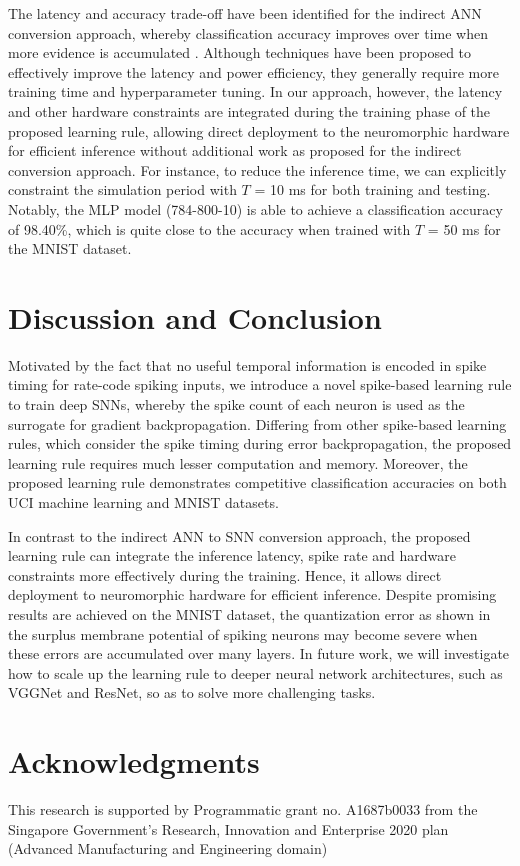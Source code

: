 \documentclass[conference]{IEEEtran}
\begin{document}
The latency and accuracy trade-off have been identified for the indirect ANN conversion approach, whereby classification accuracy improves over time when more evidence is accumulated \cite{diehl2015fast}. Although techniques \cite{neil2016learning} have been proposed to effectively improve the latency and power efficiency, they generally require more training time and hyperparameter tuning. In our approach, however, the latency and other hardware constraints are integrated during the training phase of the proposed learning rule, allowing direct deployment to the neuromorphic hardware for efficient inference without additional work as proposed for the indirect conversion approach\cite{neil2016learning}. For instance, to reduce the inference time, we can explicitly constraint the simulation period with $T$ = 10 ms for both training and testing. Notably, the MLP model (784-800-10) is able to achieve a classification accuracy of 98.40\%, which is quite close to the accuracy when trained with $T$ = 50 ms for the MNIST dataset.

\section{Discussion and Conclusion}
Motivated by the fact that no useful temporal information is encoded in spike timing for rate-code spiking inputs, we introduce a novel spike-based learning rule to train deep SNNs, whereby the spike count of each neuron is used as the surrogate for gradient backpropagation. Differing from other spike-based learning rules, which consider the spike timing during error backpropagation\cite{lee2016training, shrestha2018slayer}, the proposed learning rule requires much lesser computation and memory. Moreover, the proposed learning rule demonstrates competitive classification accuracies on both UCI machine learning and MNIST datasets. 

In contrast to the indirect ANN to SNN conversion approach, the proposed learning rule can integrate the inference latency, spike rate and hardware constraints more effectively during the training. Hence, it allows direct deployment to neuromorphic hardware for efficient inference. Despite promising results are achieved on the MNIST dataset, the quantization error as shown in the surplus membrane potential of spiking neurons may become severe when these errors are accumulated over many layers. In future work, we will investigate how to scale up the learning rule to deeper neural network architectures, such as VGGNet and ResNet, so as to solve more challenging tasks. 

\section*{Acknowledgments}
This research is supported by Programmatic grant no. A1687b0033 from the Singapore Government's Research, Innovation and Enterprise 2020 plan (Advanced Manufacturing and Engineering domain)



\end{document}
